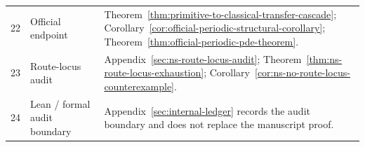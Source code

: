 \begin{center}
\begin{tabularx}{0.98\textwidth}{@{}L{0.08\textwidth}L{0.27\textwidth}Y@{}}
22 & Official endpoint & Theorem~\ref{thm:primitive-to-classical-transfer-cascade}; Corollary~\ref{cor:official-periodic-structural-corollary}; Theorem~\ref{thm:official-periodic-pde-theorem}.\\
23 & Route-locus audit & Appendix~\ref{sec:ns-route-locus-audit}; Theorem~\ref{thm:ns-route-locus-exhaustion}; Corollary~\ref{cor:ns-no-route-locus-counterexample}.\\
24 & Lean / formal audit boundary & Appendix~\ref{sec:internal-ledger} records the audit boundary and does not replace the manuscript proof.\\
\bottomrule
\end{tabularx}
\end{center}

